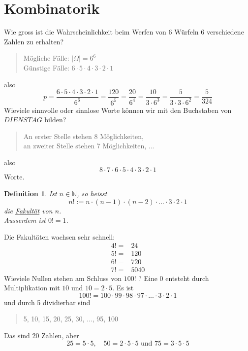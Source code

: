 \documentclass{report}
\newtheorem{mydef}{Definition}
\begin{document}
\section{Kombinatorik}
Wie gross ist die Wahrscheinlichkeit beim Werfen von 6 Würfeln 6 verschiedene Zahlen zu erhalten?
\begin{quote}
Mögliche Fälle: $|\Omega| = 6^6$\\
Günstige Fälle: $6 \cdot 5 \cdot 4 \cdot 3 \cdot 2 \cdot 1$
\end{quote}
also
\begin{equation}
p =\frac{6 \cdot 5 \cdot 4 \cdot 3 \cdot 2 \cdot 1}{6^6} = \frac{120}{6^5} = \frac{20}{6^4} = \frac{10}{3 \cdot 6^3} = \frac{5}{3 \cdot 3 \cdot 6^2} = \frac{5}{324}
\end{equation}
Wieviele sinnvolle oder sinnlose Worte können wir mit den Buchstaben von $DIENSTAG$ bilden?\\
\begin{quote}
An erster Stelle stehen 8 Möglichkeiten,\\
an zweiter Stelle stehen 7 Möglichkeiten, ...
\end{quote}
also
\begin{equation}
8 \cdot 7 \cdot 6 \cdot 5 \cdot 4 \cdot 3 \cdot 2 \cdot 1
\end{equation}
Worte.
\begin{mydef}
Ist $n \in \mathbb{N}$, so heisst
\begin{equation}
n! := n \cdot (n-1) \cdot (n-2) \cdot ... \cdot 3 \cdot 2 \cdot 1
\end{equation}
die \underline{Fakultät} von $n$.\\
Ausserdem ist $0! = 1$.
\end{mydef}
Die Fakultäten wachsen sehr schnell:
\begin{align*}
4! = & 24\\
5! = & 120\\
6! = & 720\\
7! = & 5040
\end{align*}
Wieviele Nullen stehen am Schluss von $100!$ ? Eine 0 entsteht durch Multiplikation mit $10$ und $10 = 2 \cdot 5$. Es ist
\begin{equation}
100! = 100 \cdot 99 \cdot 98 \cdot 97 \cdot ... \cdot 3 \cdot 2 \cdot 1
\end{equation}
und durch 5 dividierbar sind
\begin{quote}
5, 10, 15, 20, 25, 30, ..., 95, 100
\end{quote}
Das sind 20 Zahlen, aber
\begin{equation}
25 = 5 \cdot 5,\quad 50 = 2 \cdot 5 \cdot 5 \mbox{ und } 75 = 3 \cdot 5 \cdot 5
\end{equation}
\end{document}
